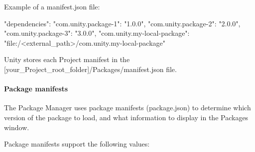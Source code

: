 Example of a {\ttfamily manifest.\+json} file\+: \begin{DoxyVerb}{
    "dependencies": {
        "com.unity.package-1": "1.0.0",
        "com.unity.package-2": "2.0.0",
        "com.unity.package-3": "3.0.0",
        "com.unity.my-local-package": "file:/<external_path>/com.unity.my-local-package"
    }
}
\end{DoxyVerb}


Unity stores each Project manifest in the {\ttfamily \mbox{[}your\+\_\+\+Project\+\_\+root\+\_\+folder\mbox{]}/\+Packages/manifest.json} file.

\label{_PackManManifestsPackage}%
 \paragraph*{Package manifests}

The Package Manager uses package manifests ({\ttfamily package.\+json}) to determine which version of the package to load, and what information to display in the Packages window.

Package manifests support the following values\+:


